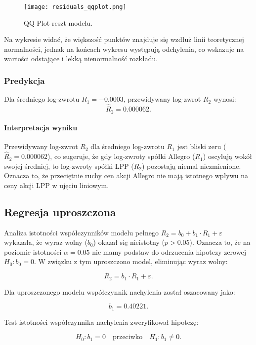 \documentclass[12pt]{article}
\begin{document}
\begin{figure}[H]
    \centering
    \texttt{[image: residuals\_qqplot.png]}
    \caption{QQ Plot reszt modelu.}
    \label{fig:residuals_qqplot}
\end{figure}

Na wykresie widać, że większość punktów znajduje się wzdłuż linii teoretycznej normalności, jednak na końcach wykresu występują odchylenia, co wskazuje na wartości odstające i lekką nienormalność rozkładu.


\subsubsection{Predykcja}
Dla średniego log-zwrotu \(R_1 = -0.0003\), przewidywany log-zwrot \(R_2\) wynosi:
\[
\hat{R}_2 = 0.000062.
\]

\paragraph{Interpretacja wyniku}

Przewidywany log-zwrot $R_2$ dla średniego log-zwrotu $R_1$ jest bliski zeru ($\hat{R}_2 = 0.000062$), co sugeruje, że gdy log-zwroty spółki Allegro ($R_1$) oscylują wokół swojej średniej, to log-zwroty spółki LPP ($R_2$) pozostają niemal niezmienione. Oznacza to, że przeciętnie ruchy cen akcji Allegro nie mają istotnego wpływu na ceny akcji LPP w ujęciu liniowym. 

\subsection{Regresja uproszczona}

Analiza istotności współczynników modelu pełnego \( R_2 = b_0 + b_1 \cdot R_1 + \varepsilon \) wykazała, że wyraz wolny (\(b_0\)) okazał się nieistotny (\(p > 0.05\)). Oznacza to, że na poziomie istotności \( \alpha = 0.05 \) nie mamy podstaw do odrzucenia hipotezy zerowej \( H_0: b_0 = 0 \). W związku z tym uproszczono model, eliminując wyraz wolny:

\[
R_2 = b_1 \cdot R_1 + \varepsilon.
\]

Dla uproszczonego modelu współczynnik nachylenia został oszacowany jako:

\[
b_1 = 0.40221.
\]

Test istotności współczynnika nachylenia zweryfikował hipotezę:

\[
H_0: b_1 = 0 \quad \text{przeciwko} \quad H_1: b_1 \neq 0.
\]
\end{document}
